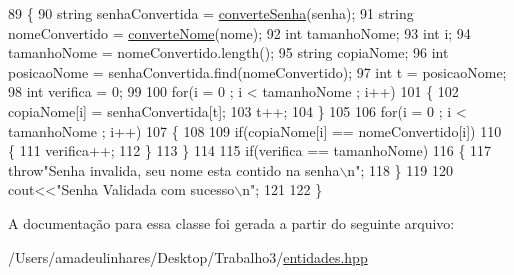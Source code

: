 \begin{DoxyCode}
89 \{
90  \textcolor{keywordtype}{string} senhaConvertida = \mbox{\hyperlink{class_leitor_ad18d27138f12d31c4d7d3b011b7d1579}{converteSenha}}(senha);
91  \textcolor{keywordtype}{string} nomeConvertido = \mbox{\hyperlink{class_leitor_a013a50e7e5d471efe31ce4f612b7399d}{converteNome}}(nome);
92  \textcolor{keywordtype}{int} tamanhoNome;
93  \textcolor{keywordtype}{int} i;
94  tamanhoNome = nomeConvertido.length();
95  \textcolor{keywordtype}{string} copiaNome;
96  \textcolor{keywordtype}{int} posicaoNome = senhaConvertida.find(nomeConvertido);
97  \textcolor{keywordtype}{int} t = posicaoNome;
98  \textcolor{keywordtype}{int} verifica = 0;
99 
100  \textcolor{keywordflow}{for}(i = 0 ; i < tamanhoNome ; i++)
101  \{
102    copiaNome[i] = senhaConvertida[t];
103    t++;
104  \}
105 
106  \textcolor{keywordflow}{for}(i = 0 ; i < tamanhoNome ; i++)
107  \{
108 
109    \textcolor{keywordflow}{if}(copiaNome[i] == nomeConvertido[i])
110    \{
111      verifica++;
112    \}
113  \}
114 
115  \textcolor{keywordflow}{if}(verifica == tamanhoNome)
116  \{
117    \textcolor{keywordflow}{throw}\textcolor{stringliteral}{"Senha invalida, seu nome esta contido na senha\(\backslash\)n"};
118  \}
119 
120  cout<<\textcolor{stringliteral}{"Senha Validada com sucesso\(\backslash\)n"};
121 
122 \}
\end{DoxyCode}


A documentação para essa classe foi gerada a partir do seguinte arquivo\+:\begin{DoxyCompactItemize}
\item 
/\+Users/amadeulinhares/\+Desktop/\+Trabalho3/\mbox{\hyperlink{entidades_8hpp}{entidades.\+hpp}}\end{DoxyCompactItemize}
